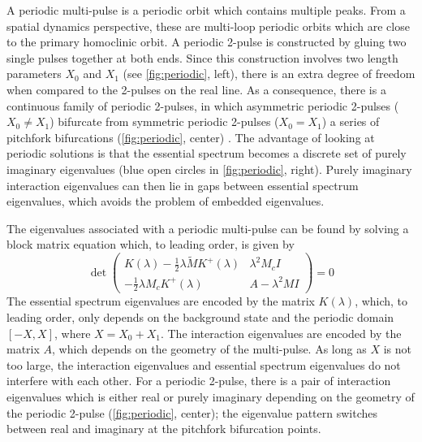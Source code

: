 \documentclass[12pt,reqno,oneside]{article}
\theoremstyle{definition}
\theoremstyle{remark}
\begin{document}
A periodic multi-pulse is a periodic orbit which contains multiple peaks. From a spatial dynamics perspective, these are multi-loop periodic orbits which are close to the primary homoclinic orbit. A periodic 2-pulse is constructed by gluing two single pulses together at both ends. Since this construction involves two length parameters $X_0$ and $X_1$ (see \cref{fig:periodic}, left), there is an extra degree of freedom when compared to the 2-pulses on the real line. As a consequence, there is a continuous family of periodic 2-pulses, in which asymmetric periodic 2-pulses ($X_0 \neq X_1$) bifurcate from symmetric periodic 2-pulses ($X_0 = X_1$) a series of pitchfork bifurcations (\cref{fig:periodic}, center) \cite{ParkerKdV}. The advantage of looking at periodic solutions is that the essential spectrum becomes a discrete set of purely imaginary eigenvalues (blue open circles in \cref{fig:periodic}, right). Purely imaginary interaction eigenvalues can then lie in gaps between essential spectrum eigenvalues, which avoids the problem of embedded eigenvalues. 

The eigenvalues associated with a periodic multi-pulse can be found by solving a block matrix equation \cite[Theorem 5.3]{ParkerKdV} which, to leading order, is given by
\begin{equation}\label{blockmatrix}
\det \begin{pmatrix}
K(\lambda) - \frac{1}{2} \lambda \tilde{M} K^+(\lambda) & \lambda^2 M_c I \\
-\frac{1}{2} \lambda M_c K^+(\lambda) & A - \lambda^2 MI  
\end{pmatrix} = 0
\end{equation}
The essential spectrum eigenvalues are encoded by the matrix $K(\lambda)$, which, to leading order, only depends on the background state and the periodic domain $[-X, X]$, where $X = X_0 + X_1$. The interaction eigenvalues are encoded by the matrix $A$, which depends on the geometry of the multi-pulse. As long as $X$ is not too large, the interaction eigenvalues and essential spectrum eigenvalues do not interfere with each other. For a periodic 2-pulse, there is a pair of interaction eigenvalues which is either real or purely imaginary depending on the geometry of the periodic 2-pulse (\cref{fig:periodic}, center); the eigenvalue pattern switches between real and imaginary at the pitchfork bifurcation points.  
\end{document}
